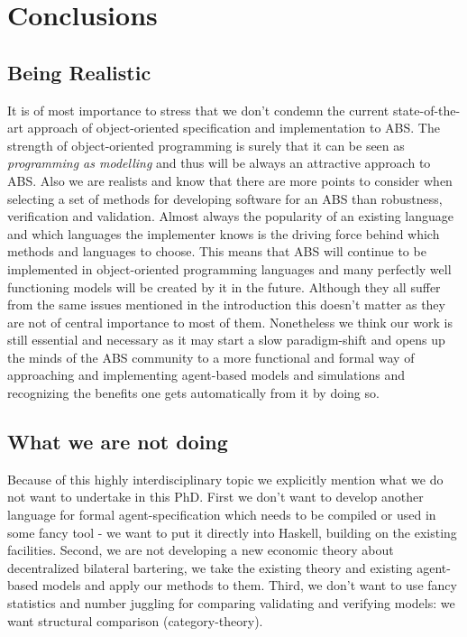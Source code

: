 \chapter{Conclusions}
\label{chap:concl}

\section{Being Realistic}
It is of most importance to stress that we don't condemn the current state-of-the-art approach of object-oriented specification and implementation to ABS. The strength of object-oriented programming is surely that it can be seen as \textit{programming as modelling} and thus will be always an attractive approach to ABS. Also we are realists and know that there are more points to consider when selecting a set of methods for developing software for an ABS than robustness, verification and validation. Almost always the popularity of an existing language and which languages the implementer knows is the driving force behind which methods and languages to choose. This means that ABS will continue to be implemented in object-oriented programming languages and many perfectly well functioning models will be created by it in the future. Although they all suffer from the same issues mentioned in the introduction this doesn't matter as they are not of central importance to most of them.
Nonetheless we think our work is still essential and necessary as it may start a slow paradigm-shift and opens up the minds of the ABS community to a more functional and formal way of approaching and implementing agent-based models and simulations and recognizing the benefits one gets automatically from it by doing so.

\section{What we are not doing}
Because of this highly interdisciplinary topic we explicitly mention what we do not want to undertake in this PhD.
First we don't want to develop another language for formal agent-specification which needs to be compiled or used in some fancy tool - we want to put it directly into Haskell, building on the existing facilities.
Second, we are not developing a new economic theory about decentralized bilateral bartering, we take the existing theory and existing agent-based models and apply our methods to them.
Third, we don't want to use fancy statistics and number juggling for comparing validating and verifying models: we want structural comparison (category-theory).